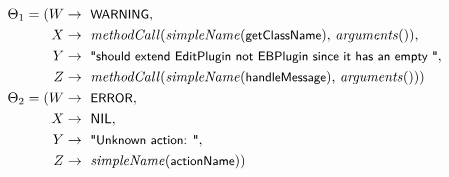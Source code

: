 \begin{align}
\Theta_1 = (W &\rightarrow \text{ \textsf{\small WARNING}},\nonumber\\
X &\rightarrow \text{ \textit{methodCall}(\textit{simpleName}(\textsf{\small getClassName}), \textit{arguments}())},\nonumber\\
Y &\rightarrow \text{ \textsf{\small "should extend EditPlugin not EBPlugin since it has an empty "}},\nonumber\\
Z &\rightarrow \text{ \textit{methodCall}(\textit{simpleName}(\textsf{\small handleMessage}), \textit{arguments}())})\\
\Theta_2 = (W &\rightarrow \text{ \textsf{\small ERROR}},\nonumber\\
X &\rightarrow \text{ \textsf{NIL}},\nonumber\\
Y &\rightarrow \text{ \textsf{\small "Unknown action: "}},\nonumber\\
Z &\rightarrow \text{ \textit{simpleName}(\textsf{\small actionName})})
\end{align}


